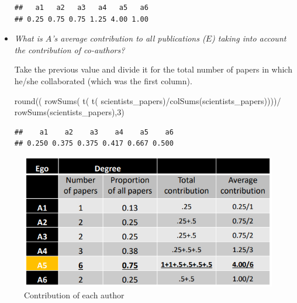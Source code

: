 \documentclass[
  notitlepage,
  onecolumn,
  openany]{book}
\newenvironment{Shaded}{\begin{snugshade}}{\end{snugshade}}
\newcommand{\DecValTok}[1]{\textcolor[rgb]{0.00,0.00,0.81}{#1}}
\newcommand{\FunctionTok}[1]{\textcolor[rgb]{0.00,0.00,0.00}{#1}}
\newcommand{\NormalTok}[1]{#1}
\newcommand{\SpecialCharTok}[1]{\textcolor[rgb]{0.00,0.00,0.00}{#1}}
\begin{document}
\begin{itemize}
\begin{verbatim}
##   a1   a2   a3   a4   a5   a6 
## 0.25 0.75 0.75 1.25 4.00 1.00
\end{verbatim}
\item
  \emph{What is \(A\)'s average contribution to all publications (\(E\)) taking into account the contribution of co-authors?}

  Take the previous value and divide it for the total number of papers in which he/she collaborated (which was the first column).

\begin{Shaded}
\begin{Highlighting}[]
\FunctionTok{round}\NormalTok{((}
  \FunctionTok{rowSums}\NormalTok{(}
    \FunctionTok{t}\NormalTok{(}
      \FunctionTok{t}\NormalTok{(}
\NormalTok{        scientists\_papers)}\SpecialCharTok{/}\FunctionTok{colSums}\NormalTok{(scientists\_papers))))}\SpecialCharTok{/}
    \FunctionTok{rowSums}\NormalTok{(scientists\_papers),}\DecValTok{3}\NormalTok{) }
\end{Highlighting}
\end{Shaded}

\begin{verbatim}
##    a1    a2    a3    a4    a5    a6 
## 0.250 0.375 0.375 0.417 0.667 0.500
\end{verbatim}
\end{itemize}

\begin{figure}[h!]

{\centering \includegraphics[width=0.5\linewidth]{images/10-Two mode networks/Untitled 5} 

}

\caption{Contribution of each author}\label{fig:unnamed-chunk-68}
\end{figure}
\end{document}
